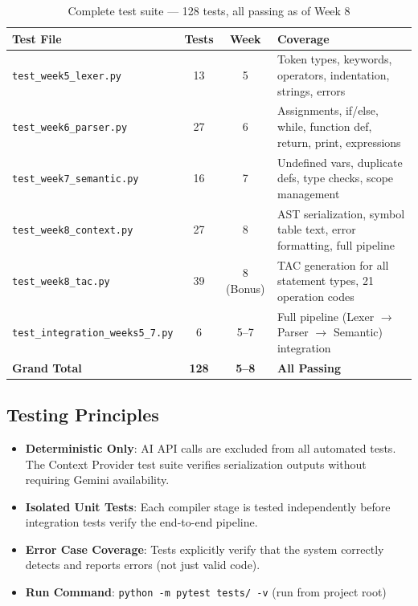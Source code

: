 \documentclass[a4paper,11pt]{article}
\begin{document}
\begin{table}[h!]
\centering
\begin{tabularx}{\textwidth}{|l|c|c|X|}
\hline
\rowcolor{blue!10}
\textbf{Test File} & \textbf{Tests} & \textbf{Week} & \textbf{Coverage} \\
\hline
\texttt{test\_week5\_lexer.py} & 13 & 5 & Token types, keywords, operators, indentation, strings, errors \\
\hline
\texttt{test\_week6\_parser.py} & 27 & 6 & Assignments, if/else, while, function def, return, print, expressions \\
\hline
\texttt{test\_week7\_semantic.py} & 16 & 7 & Undefined vars, duplicate defs, type checks, scope management \\
\hline
\texttt{test\_week8\_context.py} & 27 & 8 & AST serialization, symbol table text, error formatting, full pipeline \\
\hline
\texttt{test\_week8\_tac.py} & 39 & 8 (Bonus) & TAC generation for all statement types, 21 operation codes \\
\hline
\texttt{test\_integration\_weeks5\_7.py} & 6 & 5--7 & Full pipeline (Lexer $\rightarrow$ Parser $\rightarrow$ Semantic) integration \\
\hline
\textbf{Grand Total} & \textbf{128} & \textbf{5--8} & \textbf{All Passing} \\
\hline
\end{tabularx}
\caption{Complete test suite --- 128 tests, all passing as of Week 8}
\end{table}

\subsection{Testing Principles}

\begin{itemize}
    \item \textbf{Deterministic Only}: AI API calls are excluded from all automated tests. The Context Provider test suite verifies serialization outputs without requiring Gemini availability.
    \item \textbf{Isolated Unit Tests}: Each compiler stage is tested independently before integration tests verify the end-to-end pipeline.
    \item \textbf{Error Case Coverage}: Tests explicitly verify that the system correctly detects and reports errors (not just valid code).
    \item \textbf{Run Command}: \texttt{python -m pytest tests/ -v} (run from project root)
\end{itemize}
\end{document}
